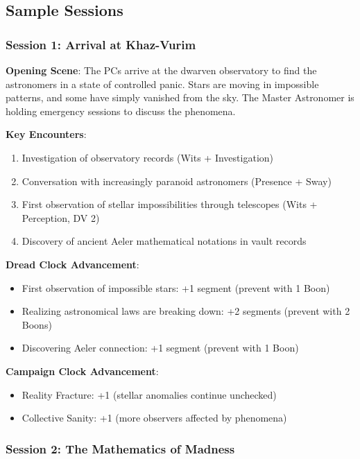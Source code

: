 \documentclass[11pt]{article}
\begin{document}
\subsection*{Sample Sessions}

\subsubsection*{Session 1: Arrival at Khaz-Vurim}

\textbf{Opening Scene}: The PCs arrive at the dwarven observatory to find the astronomers in a state of controlled panic. Stars are moving in impossible patterns, and some have simply vanished from the sky. The Master Astronomer is holding emergency sessions to discuss the phenomena.

\textbf{Key Encounters}:
\begin{enumerate}[leftmargin=*]
\item Investigation of observatory records (Wits + Investigation)
\item Conversation with increasingly paranoid astronomers (Presence + Sway)
\item First observation of stellar impossibilities through telescopes (Wits + Perception, DV 2)
\item Discovery of ancient Aeler mathematical notations in vault records
\end{enumerate}

\textbf{Dread Clock Advancement}: 
\begin{itemize}[leftmargin=*]
\item First observation of impossible stars: +1 segment (prevent with 1 Boon)
\item Realizing astronomical laws are breaking down: +2 segments (prevent with 2 Boons)
\item Discovering Aeler connection: +1 segment (prevent with 1 Boon)
\end{itemize}

\textbf{Campaign Clock Advancement}:
\begin{itemize}[leftmargin=*]
\item Reality Fracture: +1 (stellar anomalies continue unchecked)
\item Collective Sanity: +1 (more observers affected by phenomena)
\end{itemize}

\subsubsection*{Session 2: The Mathematics of Madness}
\end{document}
